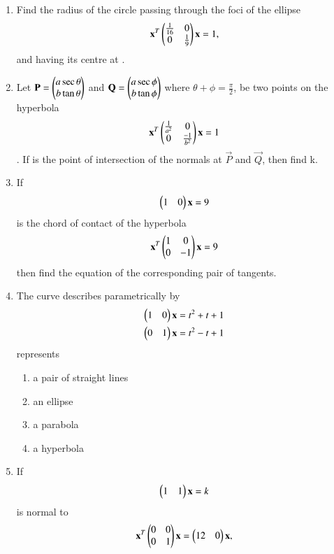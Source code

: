 \begin{enumerate}[label=\arabic*.,ref=\thesubsection.\theenumi]
\item Find the radius of the circle passing through the foci of the ellipse 
	\begin{align}
	\mathbf {x}^T \begin{pmatrix}\frac{1}{16}&0 \\ 0&\frac{1}{9}\end{pmatrix}\mathbf {x}=1,
	\end{align} and having its centre at . 
\item Let $\mathbf{P} = \begin{pmatrix}a\sec\theta \\ b\tan\theta\end{pmatrix}$
	and $\mathbf{Q}=\begin{pmatrix}a\sec\phi \\ b\tan\phi\end{pmatrix}$ where $\theta+\phi=\frac{\pi}{2}$, be two points on  the hyperbola 
    \begin{align}
    \mathbf{x}^T \begin{pmatrix} \frac{1}{a^2}&0 \\ 0&\frac{-1}{b^2}\end{pmatrix}\mathbf {x}=1
    \end{align}. If  is the point of intersection of the normals at $\vec{P}$ and 
    $\vec{Q}$, then find k.
\item If 
	\begin{align}
    \begin{pmatrix}1&0\end{pmatrix}\mathbf {x}=9
    \end{align} is the chord of contact of the hyperbola 
    \begin{align}
    \mathbf {x}^T \begin{pmatrix}1&0 \\ 0&-1\end{pmatrix}\mathbf {x}=9
    \end{align} then find the equation of the corresponding pair of tangents.
\item The curve describes parametrically by 
    \begin{align}
    \begin{pmatrix}1&0\end{pmatrix}\mathbf {x}=t^2+t+1\\
    \begin{pmatrix}0&1\end{pmatrix}\mathbf {x}=t^2-t+1
    \end{align} represents
    \begin{enumerate}
    \item a pair of straight lines 
    \item an ellipse
    \item a parabola
    \item a hyperbola
    \end{enumerate}
\item If 
	\begin{align}
    \begin{pmatrix}1&1\end{pmatrix}\mathbf{x}=k
    \end{align} is normal to 
    \begin{align}
    \vec {x}^T\myvec{0 & 0 \\0 & 1} \vec{x}=\myvec{12&0}\vec{x},

\end{align}
\end{enumerate}
